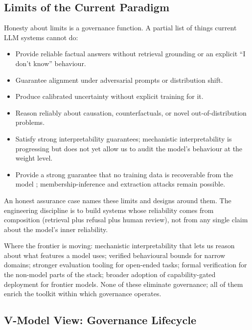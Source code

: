 \subsection{Limits of the Current Paradigm}

Honesty about limits is a governance function. A partial list
of things current LLM systems cannot do:

\begin{itemize}
  \item Provide reliable factual answers without retrieval
        grounding or an explicit ``I don't know'' behaviour.
  \item Guarantee alignment under adversarial prompts or
        distribution shift.
  \item Produce calibrated uncertainty without explicit training
        for it.
  \item Reason reliably about causation, counterfactuals, or
        novel out-of-distribution problems.
  \item Satisfy strong interpretability guarantees; mechanistic
        interpretability is progressing but does not yet allow
        us to audit the model's behaviour at the weight level.
  \item Provide a strong guarantee that no training data is
        recoverable from the model
        \citep{weidinger2021ethical}; membership-inference and
        extraction attacks remain possible.
\end{itemize}

An honest assurance case names these limits and designs around
them. The engineering discipline is to build systems whose
reliability comes from composition (retrieval plus refusal plus
human review), not from any single claim about the model's
inner reliability.

Where the frontier is moving: mechanistic interpretability that
lets us reason about what features a model uses; verified
behavioural bounds for narrow domains; stronger evaluation
tooling for open-ended tasks; formal verification for the
non-model parts of the stack; broader adoption of
capability-gated deployment for frontier models. None of these
eliminate governance; all of them enrich the toolkit within which
governance operates.

\subsection{V-Model View: Governance Lifecycle}

